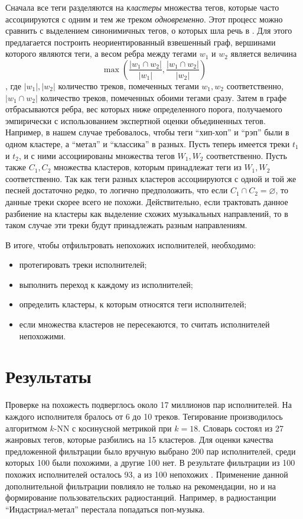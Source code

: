 Сначала все теги разделяются на \emph{кластеры} \ld множества тегов, которые
часто ассоциируются с одним и тем же треком \emph{одновременно}. Этот процесс можно сравнить с выделением синонимичных тегов, о которых
шла речь в \cite{msordo_thesis}. Для этого предлагается построить неориентированный взвешенный граф, вершинами которого являются теги, а весом ребра между
тегами $w_1$ и $w_2$ является величина
$$ \max \left ( \frac{|w_1 \cap w_2|}{|w_1|}, \frac{|w_1 \cap w_2|}{|w_2|} \right ) $$,
где $|w_1|, |w_2|$ \ld количество треков, помеченных тегами $w_1, w_2$ соответственно, $|w_1 \cap w_2|$ \ld количество треков, 
помеченных обоими тегами сразу. Затем в графе отбрасываются ребра, вес которых ниже определенного порога, получаемого эмпирически с 
использованием экспертной оценки объединенных тегов. Например, в нашем случае требовалось, чтобы теги ``хип-хоп'' и ``рэп''
были в одном кластере, а ``метал'' и ``классика'' \ld в разных. Пусть теперь имеется треки $t_1$ и $t_2$, и с ними ассоциированы множества тегов
$W_1, W_2$ соответственно. Пусть также $C_1, C_2$ \ld множества кластеров, которым принадлежат теги из $W_1, W_2$ соответственно. 
Так как теги разных кластеров ассоциируются с одной и той же песней достаточно редко, то логично предположить, что если $C_1 \cap C_2 = \varnothing$, 
то данные треки скорее всего не похожи. Действительно, если трактовать данное разбиение на кластеры как выделение схожих 
музыкальных направлений, то в таком случае эти треки будут принадлежать разным направлениям.

В итоге, чтобы отфильтровать непохожих исполнителей, необходимо:
\begin{itemize}
 \item протегировать треки исполнителей;
 \item выполнить переход к каждому из исполнителей;
 \item определить кластеры, к которым относятся теги исполнителей;
 \item если множества кластеров не пересекаются, то считать исполнителей непохожими.
\end{itemize}

\section{Результаты}

Проверке на похожесть подверглось около 17 миллионов пар исполнителей. На каждого исполнителя бралось от 6 до 10 треков. Тегирование производилось 
алгоритмом $k$-NN с косинусной метрикой при $k = 18$. Словарь состоял из 27 жанровых тегов, которые разбились на 15 кластеров.
Для оценки качества предложенной фильтрации было вручную выбрано 200 пар исполнителей, среди которых 100
были похожими, а другие 100 \ld нет. В результате фильтрации из 100 похожих исполнителей осталось 93, а из 100 непохожих .
Применение данной дополнительной фильтрации повлияло не только на рекомендации, но и на формирование пользовательских радиостанций.
Например, в радиостанции ``Индастриал-метал'' перестала попадаться поп-музыка.

